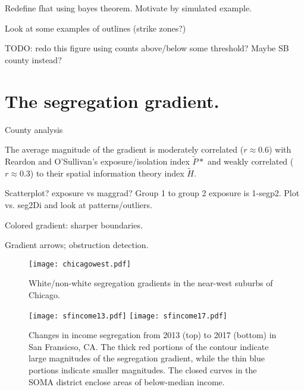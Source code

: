 \documentclass{article}
\theoremstyle{theorem}
\theoremstyle{definition}
\begin{document}
Redefine fhat using bayes theorem. Motivate by simulated example.

Look at some examples of outlines (strike zones?)

TODO: redo this figure using counts above/below some threshold? Maybe SB county instead?

\section{The segregation gradient.}

County analysis

The average magnitude of the gradient is moderately correlated ($r \approx 0.6$) with Reardon and O'Sullivan's exposure/isolation index $\tilde{P}*$ and weakly correlated ($r\approx 0.3$) to their spatial information theory index $\tilde{H}$.

Scatterplot? exposure vs maggrad? Group 1 to group 2 exposure is 1-segp2. Plot vs. seg2Di and look at patterns/outliers.

Colored gradient: sharper boundaries.

Gradient arrows; obstruction detection.

\begin{figure}
  \texttt{[image: chicagowest.pdf]}
  \caption{White/non-white segregation gradients in the near-west suburbs of Chicago.}
  \label{fig:chicagowest}
\end{figure}

\begin{figure}
  \texttt{[image: sfincome13.pdf]}
  \texttt{[image: sfincome17.pdf]}
  \caption{Changes in income segregation from 2013 (top) to 2017 (bottom) in San Fransicso, CA. The thick red portions of the contour indicate large magnitudes of the segregation gradient, while the thin blue portions indicate smaller magnitudes. The closed curves in the SOMA district enclose areas of below-median income.}
  \label{fig:sfincome}
\end{figure}


\end{document}
